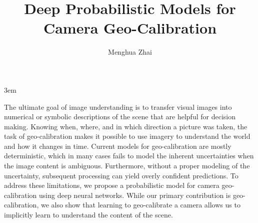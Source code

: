 \documentclass[final]{ukthesis}
\begin{document}
\emergencystretch 3em

\author{Menghua Zhai}
\title{Deep Probabilistic Models for Camera Geo-Calibration}

\abstract
{ \SingleSpacing
The ultimate goal of image understanding is to transfer visual
images into numerical or symbolic descriptions of the scene
that are helpful for decision making.
Knowing when, where, and in which direction a picture was taken, the
task of geo-calibration makes it possible to use imagery to understand
the world and how it changes in time. Current models for
geo-calibration are mostly deterministic, which in many cases fails to
model the inherent uncertainties when the image content is
ambiguous. Furthermore, without a proper modeling of the uncertainty, subsequent
processing can yield overly confident predictions.
To address these limitations, we propose a probabilistic model for
camera geo-calibration using deep neural networks.
While our primary contribution is geo-calibration, we also show that
learning to geo-calibrate a camera allows us to implicitly learn to
understand the content of the scene.
}


\frontmatter
\maketitle



\tableofcontents\clearpage

\mainmatter




\backmatter




\end{document}
